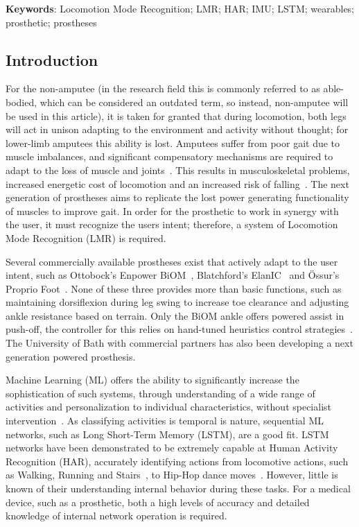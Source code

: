 \textbf{Keywords}: Locomotion Mode Recognition; LMR; HAR; IMU; LSTM; wearables; prosthetic; prostheses
\clearpage

\subsection{Introduction}
For the non-amputee %
(in the research field this is commonly referred to as able-bodied, which can be considered an outdated term, so instead, non-amputee will be used in this article), it is taken for granted that during locomotion, both legs will act in unison adapting to the environment and activity without thought; for lower-limb amputees this ability is lost. Amputees suffer from poor gait due to muscle imbalances, and significant compensatory mechanisms are required to adapt to the loss of muscle and joints~\cite{Silverman2008}. This results in musculoskeletal problems, increased energetic cost of locomotion and an increased risk of falling~\cite{Herr2012, Piazza2017, McDonald2018}. The next generation of prostheses aims to replicate the lost power generating functionality of muscles to improve gait. In order for the prosthetic to work in synergy with the user, it must recognize the users intent; therefore, a system of Locomotion Mode Recognition (LMR) is required.

Several commercially available prostheses exist that actively adapt to the user intent, such as Ottobock's Enpower BiOM~\cite{Enpower}, Blatchford's ElanIC~\cite{ElanIC} and \"Ossur's Proprio Foot~\cite{Proprio}. None of these three provides more than basic functions, such as maintaining dorsiflexion during leg swing to increase toe clearance and adjusting ankle resistance based on terrain. Only the BiOM ankle offers powered assist in push-off, the controller for this relies on hand-tuned heuristics control strategies~\cite{Montgomery2018}. The University of Bath with commercial partners has also been developing a next generation powered prosthesis\cite{Yu2019}.

Machine Learning (ML) offers the ability to significantly increase the sophistication of such systems, through understanding of a wide range of activities and personalization to individual characteristics, without specialist intervention~\cite{Labarriere2020}. As classifying activities is temporal is nature, sequential ML networks, such as Long Short-Term Memory (LSTM), are a good fit. LSTM networks have been demonstrated to be extremely capable at Human Activity Recognition (HAR), accurately identifying actions from locomotive actions, such as Walking, Running and Stairs~\cite{Murad2017}, to Hip-Hop dance moves~\cite{Samprita2020}. However, little is known of their understanding internal behavior during these tasks. For a medical device, such as a prosthetic, both a high levels of accuracy and detailed knowledge of internal network operation is required.

